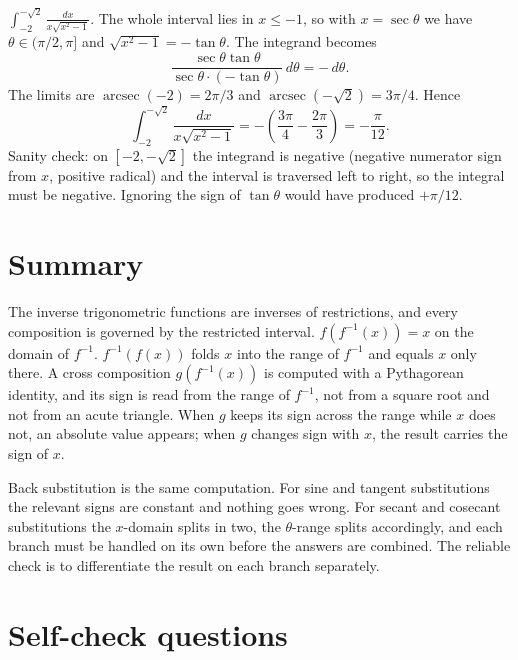 \documentclass{essay}
\DeclareMathOperator{\arcsec}{arcsec}
\begin{document}
\begin{example}
$\displaystyle\int_{-2}^{-\sqrt{2}} \frac{dx}{x\sqrt{x^2 - 1}}$. The
whole interval lies in $x \le -1$, so with $x = \sec\theta$ we have
$\theta \in (\pi/2, \pi]$ and $\sqrt{x^2 - 1} = -\tan\theta$. The
integrand becomes
\[
\frac{\sec\theta\tan\theta}{\sec\theta\cdot(-\tan\theta)}\,d\theta
= -\,d\theta.
\]
The limits are $\arcsec(-2) = 2\pi/3$ and $\arcsec(-\sqrt{2}) = 3\pi/4$.
Hence
\[
\int_{-2}^{-\sqrt{2}} \frac{dx}{x\sqrt{x^2 - 1}}
= -\left(\frac{3\pi}{4} - \frac{2\pi}{3}\right) = -\frac{\pi}{12}.
\]
Sanity check: on $[-2, -\sqrt{2}]$ the integrand is negative (negative
numerator sign from $x$, positive radical) and the interval is traversed
left to right, so the integral must be negative. Ignoring the sign of
$\tan\theta$ would have produced $+\pi/12$.
\end{example}

\section{Summary}

The inverse trigonometric functions are inverses of restrictions, and
every composition is governed by the restricted interval.
$f(f^{-1}(x)) = x$ on the domain of $f^{-1}$. $f^{-1}(f(x))$ folds $x$
into the range of $f^{-1}$ and equals $x$ only there. A cross composition
$g(f^{-1}(x))$ is computed with a Pythagorean identity, and its sign is
read from the range of $f^{-1}$, not from a square root and not from an
acute triangle. When $g$ keeps its sign across the range while $x$ does
not, an absolute value appears; when $g$ changes sign with $x$, the
result carries the sign of $x$.

Back substitution is the same computation. For sine and tangent
substitutions the relevant signs are constant and nothing goes wrong. For
secant and cosecant substitutions the $x$-domain splits in two, the
$\theta$-range splits accordingly, and each branch must be handled on its
own before the answers are combined. The reliable check is to
differentiate the result on each branch separately.

\section{Self-check questions}
\end{document}
